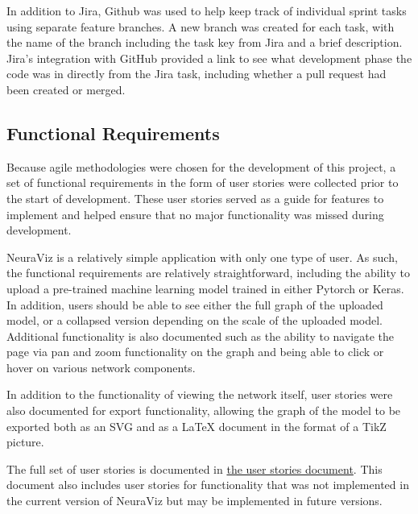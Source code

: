 In addition to Jira, Github was used to help keep track of individual sprint tasks using separate feature branches. A new branch was created for each task, with the name of the branch including the task key from Jira and a brief description. Jira's integration with GitHub provided a link to see what development phase the code was in directly from the Jira task, including whether a pull request had been created or merged.

\subsection{Functional Requirements}
Because agile methodologies were chosen for the development of this project, a set of functional requirements in the form of user stories were collected prior to the start of development. These user stories served as a guide for features to implement and helped ensure that no major functionality was missed during development.

NeuraViz is a relatively simple application with only one type of user. As such, the functional requirements are relatively straightforward, including the ability to upload a pre-trained machine learning model trained in either Pytorch or Keras. In addition, users should be able to see either the full graph of the uploaded model, or a collapsed version depending on the scale of the uploaded model. Additional functionality is also documented such as the ability to navigate the page via pan and zoom functionality on the graph and being able to click or hover on various network components. 

In addition to the functionality of viewing the network itself, user stories were also documented for export functionality, allowing the graph of the model to be exported both as an SVG and as a \LaTeX{} document in the format of a TikZ picture. 

The full set of user stories is documented in \href{https://github.com/Bennett-Wendorf/NeuraViz/blob/main/docs/user_stories.md}{the user stories document}. This document also includes user stories for functionality that was not implemented in the current version of NeuraViz but may be implemented in future versions.


